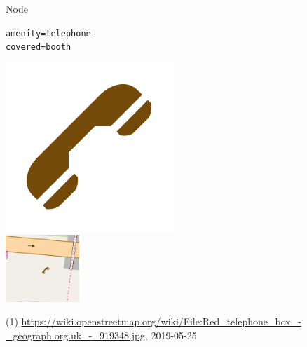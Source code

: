 \documentclass{beamer}
\begin{document}
\begin{frame}{Node}
\begin{center}
\begin{minipage}[b][0.6\textheight][c]{0.4\linewidth}
			\end{minipage}
			\begin{minipage}[b][0.6\textheight][c]{0.3\linewidth}
				\texttt{amenity=telephone}\\
				\texttt{covered=booth}
				\begin{center}
					\includegraphics[width=0.3\linewidth,height=0.3\textheight,keepaspectratio]{images/240px-Telephone.png}\\
					\vspace{0.25cm}
					\includegraphics[width=0.8\linewidth,height=0.8\textheight,keepaspectratio]{images/telephone.png}
				\end{center}
			\end{minipage}
		\end{center}
		{\tiny (1) \url{https://wiki.openstreetmap.org/wiki/File:Red_telephone_box_-_geograph.org.uk_-_919348.jpg}, 2019-05-25}
	\end{frame}
		
\end{document}
